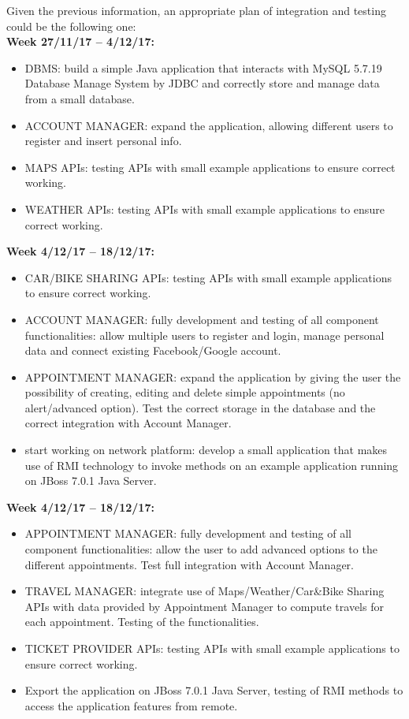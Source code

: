 Given the previous information, an appropriate plan of integration and testing could be the following one:\\
\textbf{Week 27/11/17 – 4/12/17:}
\begin{itemize}
	\item DBMS: build a simple Java application that interacts with MySQL 5.7.19 Database Manage System by JDBC and correctly store and manage data from a small database.
	\item ACCOUNT MANAGER: expand the application, allowing different users to register and insert personal info. 
	\item MAPS APIs: testing APIs with small example applications to ensure correct working.
	\item WEATHER APIs: testing APIs with small example applications to ensure correct working.
\end{itemize}
\textbf{Week 4/12/17 – 18/12/17:}
\begin{itemize}
	\item CAR/BIKE SHARING APIs: testing APIs with small example applications to ensure correct working.
	\item ACCOUNT MANAGER: fully development and testing of all component functionalities: allow multiple users to register and login, manage personal data and connect existing Facebook/Google account.
	\item APPOINTMENT MANAGER: expand the application by giving the user the possibility of creating, editing and delete simple appointments (no alert/advanced option). Test the correct storage in the database and the correct integration with Account Manager.
	\item start working on network platform: develop a small application that makes use of RMI technology to invoke methods on an example application running on JBoss 7.0.1 Java Server.
\end{itemize}
\textbf{Week 4/12/17 – 18/12/17:}
\begin{itemize}
	\item APPOINTMENT MANAGER: fully development and testing of all component functionalities: allow the user to add advanced options to the different appointments. Test full integration with Account Manager.
	\item TRAVEL MANAGER: integrate use of Maps/Weather/Car\&Bike Sharing APIs with data provided by Appointment Manager to compute travels for each appointment. Testing of the functionalities.
	\item TICKET PROVIDER APIs: testing APIs with small example applications to ensure correct working.
	\item Export the application on JBoss 7.0.1 Java Server, testing of RMI methods to access the application features from remote.
\end{itemize}
